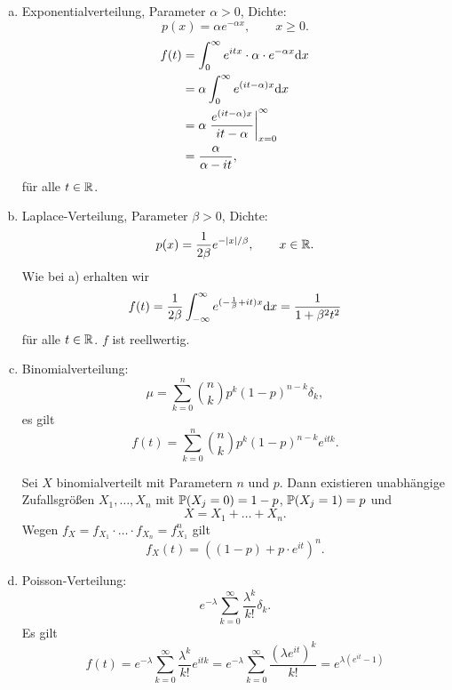 \begin{exmp*}
  \begin{enumerate}[a)]
    \item Exponentialverteilung, Parameter $\alpha > 0$, Dichte:
    \[ p(x) = \alpha e^{-\alpha x}, \qquad x \ge 0.\]
    \begin{align*}
      f(t)
      &= \int_0^\infty e^{itx} \cdot \alpha \cdot e^{-\alpha x} \mathrm{d} x \\
      &= \alpha \int_0^\infty e^{(it - \alpha) x}  \mathrm{d} x \\
      &= \alpha
        \left. \frac{e^{(it-\alpha)x}}{it - \alpha} \right|_{x=0}^\infty \\
      &= \frac{\alpha}{\alpha - it},
    \end{align*}
    für alle $t \in \mathbb{R}$.
  \item Laplace-Verteilung, Parameter $\beta > 0$, Dichte:
    \[ p(x) = \frac{1}{2\beta} e^{-|x|/\beta}, \qquad x \in \mathbb{R}. \]
    Wie bei a) erhalten wir
    \[ f(t) = \frac{1}{2 \beta} \int_{-\infty}^\infty e^{(- \frac{1}{\beta} + it)x}
      \mathrm{d} x =
      \frac{1}{1 + \beta^2 t^2}\]
    für alle $t \in \mathbb{R}$. $f$ ist reellwertig.
  \item Binomialverteilung:
    \[ \mu = \sum_{k=0}^n \binom{n}{k} p^k (1-p)^{n-k} \delta_k, \]
    es gilt
    \[ f(t) = \sum_{k=0}^n \binom{n}{k} p^k (1-p)^{n-k} e^{itk}. \]

    Sei $X$ binomialverteilt mit Parametern $n$ und $p$. Dann existieren
    unabhängige Zufallsgrößen $X_1, \ldots, X_n$ mit $\mathbb{P}(X_j = 0) = 1-p$,
    $\mathbb{P}(X_j = 1) = p$ und
    \[ X = X_1 + \ldots + X_n. \]
    Wegen $f_X = f_{X_1} \cdot \ldots \cdot f_{X_n} = f_{X_1}^n$ gilt
    \[ f_X(t) = ((1-p) + p \cdot e^{it})^n. \]
  \item Poisson-Verteilung:
    \[ e^{-\lambda} \sum_{k=0}^\infty \frac{\lambda^k}{k!} \delta_k. \]
    Es gilt
    \[ f(t) = e^{-\lambda} \sum_{k=0}^\infty \frac{\lambda^k}{k!} e^{itk}
      = e^{-\lambda} \sum_{k=0}^\infty \frac{(\lambda e^{it})^k}{k!}
      = e^{\lambda(e^{it} - 1)} \]
  \end{enumerate}
\end{exmp*}